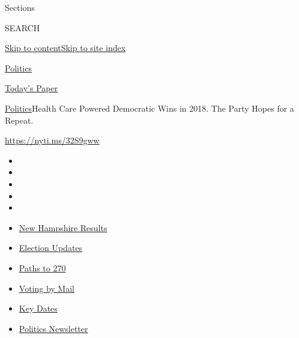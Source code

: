 Sections

SEARCH

\protect\hyperlink{site-content}{Skip to
content}\protect\hyperlink{site-index}{Skip to site index}

\href{https://www.nytimes3xbfgragh.onion/section/politics}{Politics}

\href{https://myaccount.nytimes3xbfgragh.onion/auth/login?response_type=cookie\&client_id=vi}{}

\href{https://www.nytimes3xbfgragh.onion/section/todayspaper}{Today's
Paper}

\href{/section/politics}{Politics}\textbar{}Health Care Powered
Democratic Wins in 2018. The Party Hopes for a Repeat.

\url{https://nyti.ms/32S9gww}

\begin{itemize}
\item
\item
\item
\item
\item
\end{itemize}

\begin{itemize}
\item
  \href{https://www.nytimes3xbfgragh.onion/interactive/2020/09/08/us/elections/results-new-hampshire-primary-elections.html?action=click\&pgtype=Article\&state=default\&region=TOP_BANNER\&context=storylines_menu}{New
  Hampshire Results}
\item
  \href{https://www.nytimes3xbfgragh.onion/live/2020/09/08/us/trump-vs-biden?action=click\&pgtype=Article\&state=default\&region=TOP_BANNER\&context=storylines_menu}{Election
  Updates}
\item
  \href{https://www.nytimes3xbfgragh.onion/interactive/2020/us/elections/election-states-biden-trump.html?action=click\&pgtype=Article\&state=default\&region=TOP_BANNER\&context=storylines_menu}{Paths
  to 270}
\item
  \href{https://www.nytimes3xbfgragh.onion/interactive/2020/08/31/us/politics/vote-by-mail-deadlines.html?action=click\&pgtype=Article\&state=default\&region=TOP_BANNER\&context=storylines_menu}{Voting
  by Mail}
\item
  \href{https://www.nytimes3xbfgragh.onion/interactive/2019/us/elections/2020-presidential-election-calendar.html?action=click\&pgtype=Article\&state=default\&region=TOP_BANNER\&context=storylines_menu}{Key
  Dates}
\item
  \href{https://www.nytimes3xbfgragh.onion/newsletters/politics?action=click\&pgtype=Article\&state=default\&region=TOP_BANNER\&context=storylines_menu}{Politics
  Newsletter}
\end{itemize}

